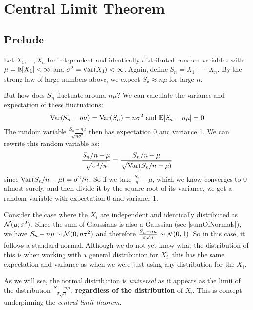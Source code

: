 \documentclass[../main.tex]{subfiles}
\begin{document}
\section{Central Limit Theorem}
\subsection{Prelude}
Let $X_1, \ldots, X_n$ be independent and identically distributed random variables with $\mu = \mathbb{E}[X_1] < \infty$ and $\sigma^2 = \operatorname{Var}(X_1) < \infty$.
Again, define $S_n = X_1 + \cdots X_n$.
By the strong law of large numbers above, we expect $S_n \approx n\mu$ for large $n$.

But how does $S_n$ fluctuate around $n \mu$?
We can calculate the variance and expectation of these fluctuations:
\[
  \operatorname{Var}(S_n - n\mu) = \operatorname{Var}(S_n) = n \sigma^2 \text{ and } \mathbb{E}[S_n - n\mu] = 0
\]
The random variable $\frac{S_n - n\mu}{\sqrt{n \sigma^2}}$ then has expectation 0 and variance 1.
We can rewrite this random variable as:
\[
  \frac{S_n/n - \mu}{\sqrt{\sigma^2/n}} = \frac{S_n/n - \mu}{\sqrt{\operatorname{Var}(S_n/n - \mu)}}
\]
since $\operatorname{Var}(S_n/n - \mu) = \sigma^2/n$.
So if we take $\frac{S_n}{n} - \mu$, which we know converges to 0 almost surely, and then divide it by the square-root of its variance, we get a random variable with expectation 0 and variance 1.

Consider the case where the $X_i$ are independent and identically distributed  as $\operatorname{\mathcal{N}}(\mu, \sigma^2)$.
Since the sum of Gaussians is also a Gaussian (see \cref{sumOfNormals}), we have $S_n - n\mu \sim \operatorname{\mathcal{N}}(0, n\sigma^2)$ and therefore $\frac{S_n - n\mu}{\sigma \sqrt{n}} \sim \operatorname{\mathcal{N}}(0, 1)$.
So in this case, it follows a standard normal.
Although we do not yet know what the distribution of this is when working with a general distribution for $X_i$, this has the same expectation and variance as when we were just using any distribution for the $X_i$.

As we will see, the normal distribution is \textit{universal} as it appears as the limit of the distribution $\frac{S_n - n\mu}{\sigma \sqrt{n}}$, \textbf{regardless of the distribution} of $X_i$.
This is concept underpinning the \textit{central limit theorem}.
\end{document}
